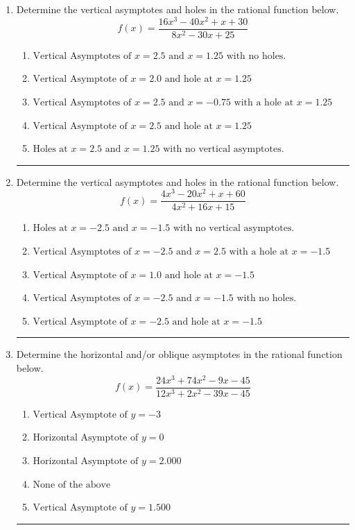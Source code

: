 \documentclass[14pt]{extbook}
\newcommand{\litem}[1]{\item#1\hspace*{-1cm}\rule{\textwidth}{0.4pt}}
\begin{document}
\begin{enumerate}
\litem{
Determine the vertical asymptotes and holes in the rational function below.\[ f(x) = \frac{16x^{3} -40 x^{2} +x + 30}{8x^{2} -30 x + 25} \]\begin{enumerate}[label=\Alph*.]
\item \( \text{Vertical Asymptotes of } x = 2.5 \text{ and } x = 1.25 \text{ with no holes.} \)
\item \( \text{Vertical Asymptote of } x = 2.0 \text{ and hole at } x = 1.25 \)
\item \( \text{Vertical Asymptotes of } x = 2.5 \text{ and } x = -0.75 \text{ with a hole at } x = 1.25 \)
\item \( \text{Vertical Asymptote of } x = 2.5 \text{ and hole at } x = 1.25 \)
\item \( \text{Holes at } x = 2.5 \text{ and } x = 1.25 \text{ with no vertical asymptotes.} \)

\end{enumerate} }
\litem{
Determine the vertical asymptotes and holes in the rational function below.\[ f(x) = \frac{4x^{3} -20 x^{2} +x + 60}{4x^{2} +16 x + 15} \]\begin{enumerate}[label=\Alph*.]
\item \( \text{Holes at } x = -2.5 \text{ and } x = -1.5 \text{ with no vertical asymptotes.} \)
\item \( \text{Vertical Asymptotes of } x = -2.5 \text{ and } x = 2.5 \text{ with a hole at } x = -1.5 \)
\item \( \text{Vertical Asymptote of } x = 1.0 \text{ and hole at } x = -1.5 \)
\item \( \text{Vertical Asymptotes of } x = -2.5 \text{ and } x = -1.5 \text{ with no holes.} \)
\item \( \text{Vertical Asymptote of } x = -2.5 \text{ and hole at } x = -1.5 \)

\end{enumerate} }
\litem{
Determine the horizontal and/or oblique asymptotes in the rational function below.\[ f(x) = \frac{24x^{3} +74 x^{2} -9 x -45}{12x^{3} +2 x^{2} -39 x -45} \]\begin{enumerate}[label=\Alph*.]
\item \( \text{Vertical Asymptote of } y = -3  \)
\item \( \text{Horizontal Asymptote of } y = 0  \)
\item \( \text{Horizontal Asymptote of } y = 2.000  \)
\item \( \text{None of the above} \)
\item \( \text{Vertical Asymptote of } y = 1.500  \)


\end{enumerate}}
\end{enumerate}
\end{document}

